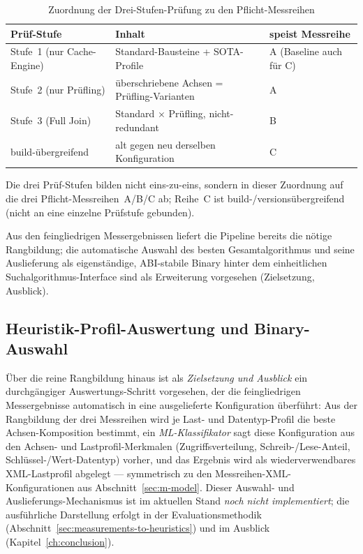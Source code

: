 \begin{table}[!htbp]
  \centering
  \caption{Zuordnung der Drei-Stufen-Prüfung zu den Pflicht-Messreihen}\label{tab:stage-series}
  \begin{tabular}{@{}lll@{}}
    \toprule
    \textbf{Prüf-Stufe} & \textbf{Inhalt} & \textbf{speist Messreihe} \\
    \midrule
    Stufe~1 (nur Cache-Engine) & Standard-Bausteine + SOTA-Profile & A (Baseline auch für C) \\
    Stufe~2 (nur Prüfling) & überschriebene Achsen = Prüfling-Varianten & A \\
    Stufe~3 (Full Join) & Standard $\times$ Prüfling, nicht-redundant & B \\
    build-übergreifend & alt gegen neu derselben Konfiguration & C \\
    \bottomrule
  \end{tabular}

  \smallskip
  {\footnotesize Die drei Prüf-Stufen bilden nicht eins-zu-eins, sondern in dieser Zuordnung auf die
  drei Pflicht-Messreihen~A/B/C ab; Reihe~C ist build-/versionsübergreifend (nicht an eine einzelne
  Prüfstufe gebunden).\par}
\end{table}

Aus den feingliedrigen Messergebnissen liefert die Pipeline
bereits die nötige Rangbildung; die automatische Auswahl des besten Gesamtalgorithmus und seine
Auslieferung als eigenständige, ABI-stabile Binary hinter dem einheitlichen
Suchalgorithmus-Interface sind als Erweiterung vorgesehen (Zielsetzung, Ausblick).

\subsection{Heuristik-Profil-Auswertung und Binary-Auswahl}\label{sec:heuristic-profile-selection}

Über die reine Rangbildung hinaus ist als \emph{Zielsetzung und Ausblick} ein durchgängiger
Auswertungs-Schritt vorgesehen, der die feingliedrigen Messergebnisse automatisch in eine
ausgelieferte Konfiguration überführt: Aus der Rangbildung der drei Messreihen wird je Last- und
Datentyp-Profil die beste Achsen-Komposition bestimmt, ein \emph{ML-Klassifikator} sagt diese
Konfiguration aus den Achsen- und Lastprofil-Merkmalen (Zugriffsverteilung, Schreib-/Lese-Anteil,
Schlüssel-/Wert-Datentyp) vorher, und das Ergebnis wird als wiederverwendbares XML-Lastprofil
abgelegt --- symmetrisch zu den Messreihen-XML-Konfigurationen aus Abschnitt~\ref{sec:m-model}.
Dieser Auswahl- und Auslieferungs-Mechanismus ist im aktuellen Stand \emph{noch nicht
implementiert}; die ausführliche Darstellung erfolgt in der Evaluationsmethodik
(Abschnitt~\ref{sec:measurements-to-heuristics}) und im Ausblick (Kapitel~\ref{ch:conclusion}).
